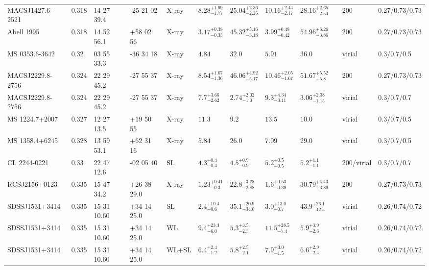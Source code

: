 \begin{landscape}
\begin{center}
{\begin{longtable}{llllllllllll}
MACSJ1427.6-2521 & 0.318 & 14 27 39.4 & -25 21 02 & X-ray & ${8.28}^{+1.99}_{-1.77}$ & ${25.04}^{+2.36}_{-2.26}$ & ${10.16}^{+2.44}_{-2.17}$ & ${28.16}^{+2.65}_{-2.54}$ & \citet{BA14.1} & 200 & 0.27/0.73/0.73 \\
Abell 1995 & 0.318 & 14 52 56.1 & +58 02 56 & X-ray & ${3.17}^{+0.38}_{-0.33}$ & ${45.32}^{+5.16}_{-3.18}$ & ${3.99}^{+0.48}_{-0.42}$ & ${54.96}^{+6.26}_{-3.86}$ & \citet{BA14.1} & 200 & 0.27/0.73/0.73 \\
MS 0353.6-3642 & 0.32 & 03 55 33.3 & -36 34 18 & X-ray & ${4.84}^{}_{}$ & ${32.0}^{}_{}$ & ${5.91}^{}_{}$ & ${36.0}^{}_{}$ & \citet{MO99.1} & virial & 0.3/0.7/0.5 \\
MACSJ2229.8-2756 & 0.324 & 22 29 45.2 & -27 55 37 & X-ray & ${8.54}^{+1.67}_{-1.36}$ & ${46.06}^{+4.92}_{-5.17}$ & ${10.46}^{+2.05}_{-1.67}$ & ${51.67}^{+5.52}_{-5.8}$ & \citet{BA14.1} & 200 & 0.27/0.73/0.73 \\
MACSJ2229.8-2756 & 0.324 & 22 29 45.2 & -27 55 37 & X-ray & ${7.7}^{+3.66}_{-2.62}$ & ${2.74}^{+2.02}_{-1.0}$ & ${9.3}^{+4.34}_{-3.11}$ & ${3.06}^{+2.38}_{-1.15}$ & \citet{SC07.1} & virial & 0.3/0.7/0.7 \\
MS 1224.7+2007 & 0.327 & 12 27 13.5 & +19 50 55 & X-ray & ${11.3}^{}_{}$ & ${9.2}^{}_{}$ & ${13.5}^{}_{}$ & ${10.0}^{}_{}$ & \citet{MO99.1} & virial & 0.3/0.7/0.5 \\
MS 1358.4+6245 & 0.328 & 13 59 53.1 & +62 31 16 & X-ray & ${5.84}^{}_{}$ & ${26.0}^{}_{}$ & ${7.09}^{}_{}$ & ${29.0}^{}_{}$ & \citet{MO99.1} & virial & 0.3/0.7/0.5 \\
CL 2244-0221 & 0.33 & 22 47 12.6 & -02 05 40 & SL & ${4.3}^{+0.4}_{-0.4}$ & ${4.5}^{+0.9}_{-0.9}$ & ${5.2}^{+0.5}_{-0.5}$ & ${5.2}^{+1.1}_{-1.1}$ & \citet{CO07.1} & 200/virial & 0.3/0.7/0.7 \\
RCSJ2156+0123 & 0.335 & 15 47 34.2 & +26 38 29.0 & X-ray & ${1.23}^{+0.41}_{-0.3}$ & ${22.8}^{+3.28}_{-2.88}$ & ${1.6}^{+0.53}_{-0.39}$ & ${30.79}^{+4.43}_{-3.89}$ & \citet{BA14.1} & 200 & 0.27/0.73/0.73 \\
SDSSJ1531+3414 & 0.335 & 15 31 10.60 & +34 14 25.0 & SL & ${2.4}^{+10.4}_{-0.6}$ & ${35.1}^{+20.9}_{-34.0}$ & ${3.0}^{+13.0}_{-0.7}$ & ${43.9}^{+26.1}_{-42.5}$ & \citet{OG09.1} & virial & 0.26/0.74/0.72 \\
SDSSJ1531+3414 & 0.335 & 15 31 10.60 & +34 14 25.0 & WL & ${9.4}^{+23.3}_{-6.0}$ & ${5.3}^{+3.5}_{-2.3}$ & ${11.5}^{+28.5}_{-7.4}$ & ${5.9}^{+3.9}_{-2.6}$ & \citet{OG09.1} & virial & 0.26/0.74/0.72 \\
SDSSJ1531+3414 & 0.335 & 15 31 10.60 & +34 14 25.0 & WL+SL & ${6.4}^{+2.4}_{-1.2}$ & ${5.8}^{+2.5}_{-2.1}$ & ${7.9}^{+3.0}_{-1.5}$ & ${6.6}^{+2.9}_{-2.4}$ & \citet{OG09.1} & virial & 0.26/0.74/0.72 \\

\end{longtable}}
\end{center}
\end{landscape}
